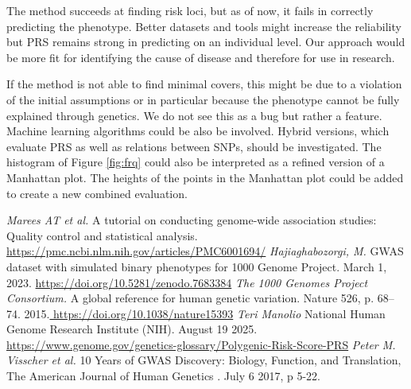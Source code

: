 \documentclass[letterpaper, 11pt]{article}
\begin{document}
The method succeeds at finding risk loci, but as of now, it fails in correctly predicting the phenotype. Better datasets and tools might increase the reliability but PRS remains strong in predicting on an individual level. Our approach would be more fit for identifying the cause of disease and therefore for use in research. 

If the method is not able to find minimal covers, this might be due to a violation of the initial assumptions or in particular because the phenotype cannot be fully explained through genetics. We do not see this as a bug but rather a feature.\\

Machine learning algorithms could be also be involved. Hybrid versions, which evaluate PRS as well as relations between SNPs, should be investigated. The histogram of Figure \ref{fig:frq} could also be interpreted as a refined version of a Manhattan plot. The heights of the points in the Manhattan plot could be added to create a new combined evaluation. 


\newpage
\begin{thebibliography}{99}
\emph{Marees AT et al. } A tutorial on conducting genome-wide association studies: Quality control and statistical analysis. \url{https://pmc.ncbi.nlm.nih.gov/articles/PMC6001694/}
\emph{Hajiaghabozorgi, M. } GWAS dataset with simulated binary phenotypes for 1000 Genome Project. March 1, 2023. \url{https://doi.org/10.5281/zenodo.7683384}
\emph{The 1000 Genomes Project Consortium.} A global reference for human genetic variation. Nature 526, p. 68–74. 2015.\url{ https://doi.org/10.1038/nature15393}
\emph{Teri Manolio} National Human Genome Research Institute (NIH). August 19 2025. \url{https://www.genome.gov/genetics-glossary/Polygenic-Risk-Score-PRS}
\emph{Peter M. Visscher et al. } 10 Years of GWAS Discovery: Biology, Function, and Translation, The American Journal of Human Genetics . July 6 2017, p 5-22. 
\end{thebibliography}
\end{document}

